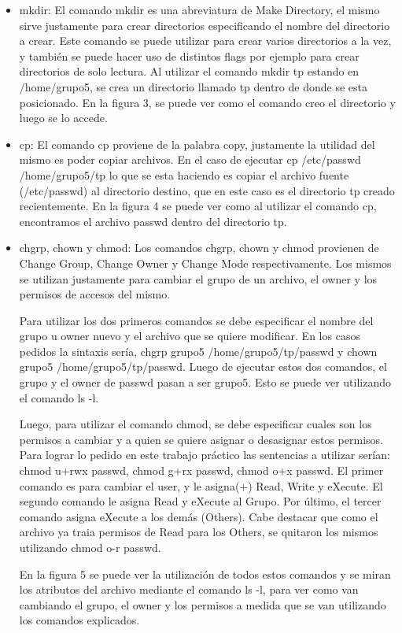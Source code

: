 \documentclass[a4paper, 12pt]{article}
\begin{document}
\begin{itemize}
\item mkdir: El comando mkdir es una abreviatura de Make Directory, el mismo sirve justamente para crear directorios especificando el nombre del directorio a crear. Este comando se puede utilizar para crear varios directorios a la vez, y tambi\'en se puede hacer uso de distintos flags por ejemplo para crear directorios de solo lectura. Al utilizar el comando mkdir tp estando en /home/grupo5, se crea un directorio llamado tp dentro de donde se esta posicionado. En la figura 3, se puede ver como el comando creo el directorio y luego se lo accede.

\item cp: El comando cp proviene de la palabra copy, justamente la utilidad del mismo es poder copiar archivos. En el caso de ejecutar cp /etc/passwd /home/grupo5/tp lo que se esta haciendo es copiar el archivo fuente (/etc/passwd) al directorio destino, que en este caso es el directorio tp creado recientemente. En la figura 4 se puede ver como al utilizar el comando cp, encontramos el archivo passwd dentro del directorio tp.

\item chgrp, chown y chmod: Los comandos chgrp, chown y chmod provienen de Change Group, Change Owner y Change Mode respectivamente. Los mismos se utilizan justamente para cambiar el grupo de un archivo, el owner y los permisos de accesos del mismo. 

Para utilizar los dos primeros comandos se debe especificar el nombre del grupo u owner nuevo y el archivo que se quiere modificar. En los casos pedidos la sintaxis ser\'ia, chgrp grupo5 /home/grupo5/tp/passwd y chown grupo5 /home/grupo5/tp/passwd. Luego de ejecutar estos dos comandos, el grupo y el owner de passwd pasan a ser grupo5. Esto se puede ver utilizando el comando ls -l.

Luego, para utilizar el comando chmod, se debe especificar cuales son los permisos a cambiar y a quien se quiere asignar o desasignar estos permisos. Para lograr lo pedido en este trabajo pr\'actico las sentencias a utilizar ser\'ian: chmod u+rwx passwd, chmod g+rx passwd, chmod o+x passwd. El primer comando es para cambiar el user, y le asigna(+) Read, Write y eXecute. El segundo comando le asigna Read y eXecute al Grupo. Por \'ultimo, el tercer comando asigna eXecute a los dem\'as (Others). Cabe destacar que como el archivo ya traia permisos de Read para los Others, se quitaron los mismos utilizando chmod o-r passwd.

En la figura 5 se puede ver la utilizaci\'on de todos estos comandos y se miran los atributos del archivo mediante el comando ls -l, para ver como van cambiando el grupo, el owner y los permisos a medida que se van utilizando los comandos explicados.


\end{itemize}
\end{document}
